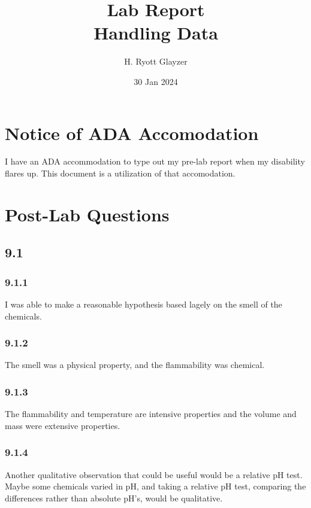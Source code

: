 \documentclass[11pt, letterpaper]{article}
\begin{document}


\title{Lab Report \\ \large Handling Data}
\author{H. Ryott Glayzer}
\date{30 Jan 2024}


\maketitle


\section*{Notice of ADA Accomodation}
I have an ADA accommodation to type out my pre-lab report when my disability flares up.
This document is a utilization of that accomodation.


\section{Post-Lab Questions}
\subsection{9.1}
\subsubsection{9.1.1}
I was able to make a reasonable hypothesis based lagely on the smell of the chemicals.

\subsubsection{9.1.2}
The smell was a physical property, and the flammability was chemical.

\subsubsection{9.1.3}
The flammability and temperature are intensive properties and the volume and mass were extensive properties.

\subsubsection{9.1.4}
Another qualitative observation that could be useful would be a relative pH test. Maybe some chemicals varied in pH,
and taking a relative pH test, comparing the differences rather than absolute pH's, would be qualitative.
\end{document}
